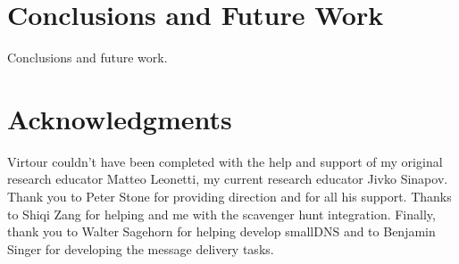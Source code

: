 \documentclass[
  oneside,
  11pt, a4paper,
  footinclude=true,
  headinclude=true,
  cleardoublepage=empty
]{article}
\begin{document}
\section{Conclusions and Future Work}

Conclusions and future work.

\section{Acknowledgments}

Virtour couldn't have been completed with the help and support of my original
research educator Matteo Leonetti, my current research educator Jivko Sinapov.
Thank you to Peter Stone for providing direction and for all his support.
Thanks to Shiqi Zang for helping and me with the scavenger hunt integration.
Finally, thank you to Walter Sagehorn for helping develop smallDNS and to
Benjamin Singer for developing the message delivery tasks.

\nocite{*}


    
\end{document}
